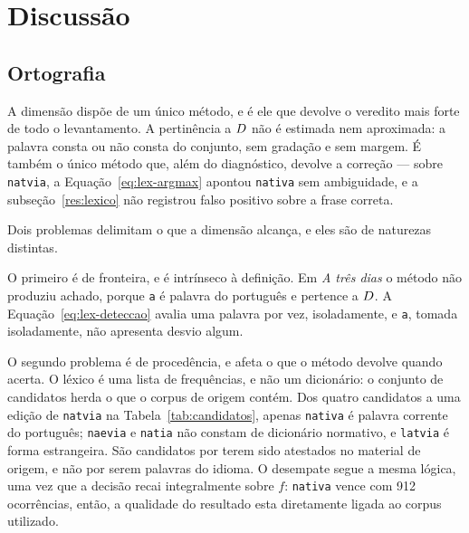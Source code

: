 %
%
\section{Discussão}
\label{sec:discussao}


\subsection{Ortografia}
\label{disc:ortografia}

\indent\indent A dimensão dispõe de um único método, e é ele que devolve o veredito mais forte de todo o
levantamento. A pertinência a $D$ não é estimada nem aproximada: a palavra consta ou não
consta do conjunto, sem gradação e sem margem. É também o único método que, além do
diagnóstico, devolve a correção --- sobre \texttt{natvia}, a Equação~\ref{eq:lex-argmax}
apontou \texttt{nativa} sem ambiguidade, e a subseção~\ref{res:lexico} não registrou falso
positivo sobre a frase correta.

Dois problemas delimitam o que a dimensão alcança, e eles são de naturezas distintas.

O primeiro é de fronteira, e é intrínseco à definição. Em \emph{A três dias} o método não
produziu achado, porque \texttt{a} é palavra do português e pertence a $D$. A Equação~\ref{eq:lex-deteccao} avalia uma palavra por
vez, isoladamente, e \texttt{a}, tomada isoladamente, não apresenta desvio algum.

O segundo problema é de procedência, e afeta o que o método devolve quando acerta. O léxico é
uma lista de frequências, e não um dicionário: o conjunto de candidatos herda o que o corpus
de origem contém. Dos quatro candidatos a uma edição de \texttt{natvia} na
Tabela~\ref{tab:candidatos}, apenas \texttt{nativa} é palavra corrente do português;
\texttt{naevia} e \texttt{natia} não constam de dicionário normativo, e \texttt{latvia} é
forma estrangeira. São candidatos por terem sido atestados no material de origem, e não por
serem palavras do idioma. O desempate segue a mesma lógica, uma vez que a decisão recai
integralmente sobre $f$: \texttt{nativa} vence com 912 ocorrências, então, a qualidade 
do resultado esta diretamente ligada ao corpus utilizado.



